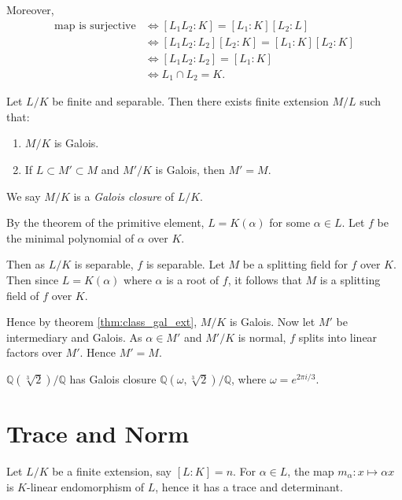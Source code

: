 \documentclass[12pt]{article}
\begin{document}
\begin{proofbox}
	Moreover,
	\begin{align*}
		\text{map is surjective} & \iff [L_1L_2:K] = [L_1:K] [L_2:L] \\
					 &\iff [L_1L_2:L_2][L_2:K] = [L_1:K][L_2:K] \\
					 &\iff [L_1L_2:L_2] = [L_1:K] \\
					 &\iff L_1 \cap L_2 = K.
	\end{align*}
\end{proofbox}

\begin{theorem}
	Let $L/K$ be finite and separable. Then there exists finite extension $M/L$ such that:
	\begin{enumerate}[\normalfont(i)]
		\item $M/K$ is Galois.
		\item If $L \subset M' \subset M$ and $M'/K$ is Galois, then $M' = M$.
	\end{enumerate}
	We say $M/K$ is a \emph{Galois closure} of $L/K$.
\end{theorem}

\begin{proofbox}
	By the theorem of the primitive element, $L = K(\alpha)$ for some $\alpha \in L$. Let $f$ be the minimal polynomial of $\alpha$ over $K$.

	Then as $L/K$ is separable, $f$ is separable. Let $M$ be a splitting field for $f$ over $K$. Then since $L = K(\alpha)$ where $\alpha$ is a root of $f$, it follows that $M$ is a splitting field of $f$ over $K$.

	Hence by theorem \ref{thm:class_gal_ext}, $M/K$ is Galois. Now let $M'$ be intermediary and Galois. As $\alpha \in M'$ and $M'/K$ is normal, $f$ splits into linear factors over $M'$. Hence $M' = M$.
\end{proofbox}


\begin{exbox}
	$\mathbb{Q}(\sqrt[3]2)/\mathbb{Q}$ has Galois closure $\mathbb{Q}(\omega, \sqrt[3]2)/\mathbb{Q}$, where $\omega = e^{2\pi i/3}$.
\end{exbox}

\newpage

\section{Trace and Norm}
\label{sec:trace_norm}

Let $L/K$ be a finite extension, say $[L:K] = n$. For $\alpha \in L$, the map $m_\alpha : x \mapsto \alpha x$ is $K$-linear endomorphism of $L$, hence it has a trace and determinant.
\end{document}
